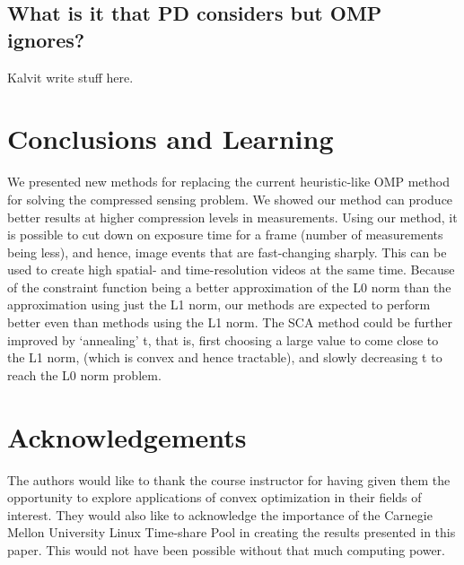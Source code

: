 \documentclass[letterpaper, 10 pt, conference]{article}
\begin{document}
\subsection{What is it that PD considers but OMP ignores?}
{\huge Kalvit write stuff here.}

\newpage
\section{Conclusions and Learning}
We presented new methods for replacing the current heuristic-like OMP method for solving the compressed sensing problem. We showed our method can produce better results at higher compression levels in measurements. Using our method, it is possible to cut down on exposure time for a frame (number of measurements being less), and hence, image events that are fast-changing sharply. This can be used to create high spatial- and time-resolution videos at the same time. Because of the constraint function being a better approximation of the L0 norm than the approximation using just the L1 norm, our methods are expected to perform better even than methods using the L1 norm. The SCA method could be further improved by `annealing' t, that is, first choosing a large value to come close to the L1 norm, (which is convex and hence tractable), and slowly decreasing t to reach the L0 norm problem.

\section{Acknowledgements}
The authors would like to thank the course instructor for having given them the opportunity to explore applications of convex optimization in their fields of interest. They would also like to acknowledge the importance of the Carnegie Mellon University Linux Time-share Pool in creating the results presented in this paper. This would not have been possible without that much computing power.
\end{document}

